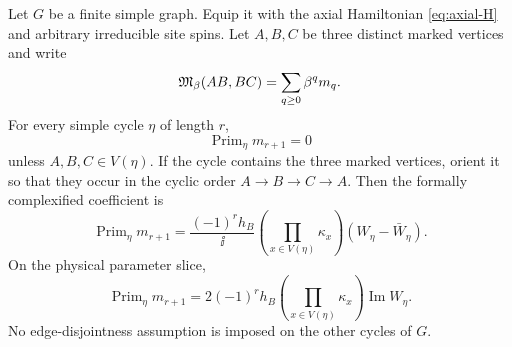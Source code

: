 \begin{proposition}
\label{prop:primitive-cycle}
Let $G$ be a finite simple graph.  Equip it with the axial Hamiltonian
\eqref{eq:axial-H} and arbitrary irreducible site spins.  Let $A,B,C$ be
three distinct marked vertices and write
\begin{equation}
 \mathfrak{M}_\beta(AB,BC)=\sum_{q\geq0}\beta^q m_q.
 \label{eq:primitive-series}
\end{equation}
For every simple cycle $\eta$ of length $r$,
\begin{equation}
 \operatorname{Prim}_\eta m_{r+1}=0
 \label{eq:primitive-cycle-zero}
\end{equation}
unless $A,B,C\in V(\eta)$.  If the cycle contains the three marked
vertices, orient it so that they occur in the cyclic order
$A\to B\to C\to A$.  Then the formally complexified coefficient is
\begin{equation}
 \boxed{
 \operatorname{Prim}_\eta m_{r+1}
 =\frac{(-1)^rh_B}{\ii}
 \left(\prod_{x\in V(\eta)}\kappa_x\right)
 \left(W_\eta-\bar W_\eta\right).}
 \label{eq:primitive-cycle-formal}
\end{equation}
On the physical parameter slice,
\begin{equation}
 \boxed{
 \operatorname{Prim}_\eta m_{r+1}
 =2(-1)^r h_B
 \left(\prod_{x\in V(\eta)}\kappa_x\right)
 \operatorname{Im}W_\eta .}
 \label{eq:primitive-cycle-coefficient}
\end{equation}
No edge-disjointness assumption is imposed on the other cycles of $G$.
\end{proposition}

